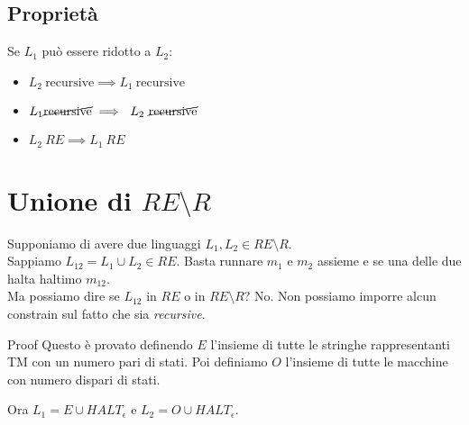 \documentclass{article}
\begin{document}
\subsection{Proprietà}
Se $L_1$ può essere ridotto a $L_2$:
\begin{itemize}
    \item $L_2\ \text{recursive}\implies L_1\ \text{recursive}$
    \item $L_1\cancel{\text{recursive}} \implies\ L_2\ \cancel{\text{recursive}}$
    \item $L_2\ RE \implies L_1\ RE$
\end{itemize}

\section{Unione di $RE\setminus R$}
Supponiamo di avere due linguaggi $L_1,L_2\in RE\setminus R$. \\
Sappiamo $L_{12}=L_1\cup L_2 \in RE$. Basta runnare $m_1$ e $m_2$ assieme e se una delle due halta haltimo $m_{12}$.\\
Ma possiamo dire se $L_12$ in $RE$ o in $RE\setminus R$? No. Non possiamo imporre alcun constrain sul fatto che sia \textit{recursive}.

\begin{callout}{Proof}
    Questo è provato definendo $E$ l'insieme di tutte le stringhe rappresentanti TM con un numero pari di stati. Poi definiamo $O$ l'insieme di tutte le macchine con numero dispari di stati.

    Ora $L_1=E\cup HALT_\epsilon$ e $L_2=O\cup HALT_\epsilon$.
\end{callout}
\end{document}
